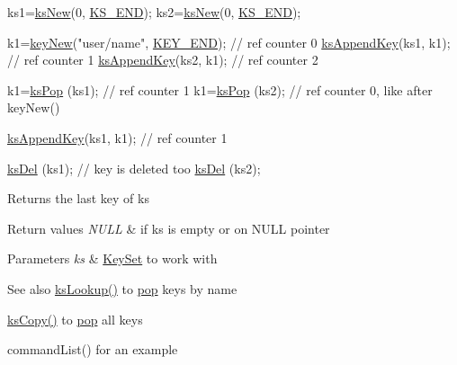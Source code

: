 \begin{DoxyCode}
ks1=\hyperlink{group__keyset_ga671e1aaee3ae9dc13b4834a4ddbd2c3c}{ksNew}(0, \hyperlink{kdbenum_8c_a7a28fce3773b2c873c94ac80b8b4cd54}{KS\_END});
ks2=\hyperlink{group__keyset_ga671e1aaee3ae9dc13b4834a4ddbd2c3c}{ksNew}(0, \hyperlink{kdbenum_8c_a7a28fce3773b2c873c94ac80b8b4cd54}{KS\_END});

k1=\hyperlink{group__key_gad23c65b44bf48d773759e1f9a4d43b89}{keyNew}(\textcolor{stringliteral}{"user/name"}, \hyperlink{group__key_gga91fb3178848bd682000958089abbaf40aa8adb6fcb92dec58fb19410eacfdd403}{KEY\_END}); \textcolor{comment}{// ref counter 0}
\hyperlink{group__keyset_gaa5a1d467a4d71041edce68ea7748ce45}{ksAppendKey}(ks1, k1); \textcolor{comment}{// ref counter 1}
\hyperlink{group__keyset_gaa5a1d467a4d71041edce68ea7748ce45}{ksAppendKey}(ks2, k1); \textcolor{comment}{// ref counter 2}

k1=\hyperlink{group__keyset_gae42530b04defb772059de0600159cf69}{ksPop} (ks1); \textcolor{comment}{// ref counter 1}
k1=\hyperlink{group__keyset_gae42530b04defb772059de0600159cf69}{ksPop} (ks2); \textcolor{comment}{// ref counter 0, like after keyNew()}

\hyperlink{group__keyset_gaa5a1d467a4d71041edce68ea7748ce45}{ksAppendKey}(ks1, k1); \textcolor{comment}{// ref counter 1}

\hyperlink{group__keyset_ga27e5c16473b02a422238c8d970db7ac8}{ksDel} (ks1); \textcolor{comment}{// key is deleted too}
\hyperlink{group__keyset_ga27e5c16473b02a422238c8d970db7ac8}{ksDel} (ks2);
\end{DoxyCode}


\begin{DoxyReturn}{Returns}
the last key of {\ttfamily ks} 
\end{DoxyReturn}

\begin{DoxyRetVals}{Return values}
{\em N\+U\+LL} & if {\ttfamily ks} is empty or on N\+U\+LL pointer \\
\hline
\end{DoxyRetVals}

\begin{DoxyParams}{Parameters}
{\em ks} & \hyperlink{classkdb_1_1KeySet}{Key\+Set} to work with \\
\hline
\end{DoxyParams}
\begin{DoxySeeAlso}{See also}
\hyperlink{group__keyset_gaa34fc43a081e6b01e4120daa6c112004}{ks\+Lookup()} to \hyperlink{classkdb_1_1KeySet_a7f207457a1c12633a1a5301a3a1bbaed}{pop} keys by name 

\hyperlink{group__keyset_gaba1f1dbea191f4d7e7eb3e4296ae7d5e}{ks\+Copy()} to \hyperlink{classkdb_1_1KeySet_a7f207457a1c12633a1a5301a3a1bbaed}{pop} all keys 

command\+List() for an example 
\end{DoxySeeAlso}
\mbox{\label{classkdb_1_1KeySet_a5bc5a16a726e959adaf3cf8506e7b849}} 
